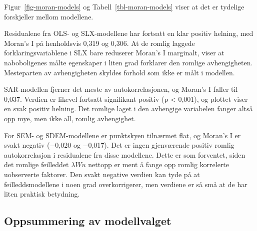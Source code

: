 \documentclass[
  norsk,
  a4paper,
]{article}
\begin{document}
\begin{table}

\caption{\label{tbl-moran-models}Moran's I for residualene fra hver
modell (k = 10).}


\end{table}%

Figur~\ref{fig-moran-models} og Tabell~\ref{tbl-moran-models} viser at
det er tydelige forskjeller mellom modellene.

Residualene fra OLS- og SLX-modellene har fortsatt en klar positiv
helning, med Moran's I på henholdsvis 0,319 og 0,306. At de romlig
laggede forklaringsvariablene i SLX bare reduserer Moran's I marginalt,
viser at naboboligenes målte egenskaper i liten grad forklarer den
romlige avhengigheten. Mesteparten av avhengigheten skyldes forhold som
ikke er målt i modellen.

SAR-modellen fjerner det meste av autokorrelasjonen, og Moran's I faller
til 0,037. Verdien er likevel fortsatt signifikant positiv (p
\textless{} 0,001), og plottet viser en svak positiv helning. Det
romlige laget i den avhengige variabelen fanger altså opp mye, men ikke
all, romlig avhengighet.

For SEM- og SDEM-modellene er punktskyen tilnærmet flat, og Moran's I er
svakt negativ (−0,020 og −0,017). Det er ingen gjenværende positiv
romlig autokorrelasjon i residualene fra disse modellene. Dette er som
forventet, siden det romlige feilleddet \(\lambda Wu\) nettopp er ment å
fange opp romlig korrelerte uobserverte faktorer. Den svakt negative
verdien kan tyde på at feilleddsmodellene i noen grad overkorrigerer,
men verdiene er så små at de har liten praktisk betydning.

\subsection{Oppsummering av
modellvalget}\label{oppsummering-av-modellvalget}
\end{document}
